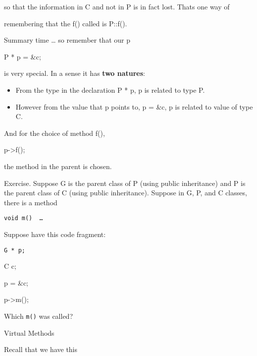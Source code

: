 so that the information in C and not in P is in fact lost.
That\textquotesingle s one way of

remembering that the f() called is P::f().

Summary time \ldots{} so remember that our p

P * p = \&c;

is very special. In a sense it has \textbf{two natures}:

\begin{itemize}
\item
  From the type in the declaration P * p, p is related to type P.
\item
  However from the value that p points to, p = \&c, p is related to
  value of type C.
\end{itemize}

And for the choice of method f(),

p-\textgreater f();

the method in the parent is chosen.

Exercise. Suppose G is the parent class of P (using public inheritance)
and P is the parent class of C (using public inheritance). Suppose in G,
P, and C classes, there is a method

\texttt{void m() { \ldots{} }}

Suppose have this code fragment:

\texttt{G * p;}

C c;

p = \&c;

p-\textgreater m();

Which \texttt{m()} was called?

Virtual Methods

Recall that we have this


